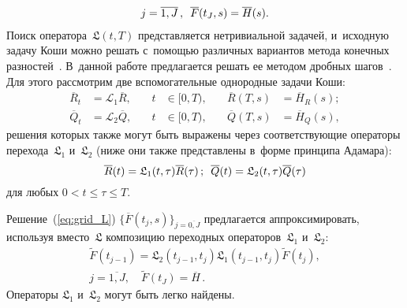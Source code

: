 \begin{multicols}{2}
\begin{multline}
 j=\overline{1,J}\,, \enskip \overline{F}(t_J,s) = \overline{H}(s).
\label{eq:grid_L}
\end{multline}
Поиск оператора~$\mathfrak{L}(t,T)$ пред\-став\-ля\-ет\-ся не\-три\-ви\-аль\-ной задачей, и~исход\-ную задачу Коши мож\-но решать 
с~по\-мощью различных вариантов метода конечных разностей~\cite{TS_04}. В~данной работе предлагается решать ее методом дроб\-ных шагов~\cite{Ya_67}. 
Для этого рас\-смот\-рим две вспомогательные од\-но\-род\-ные задачи \mbox{Коши}:
\begin{alignat}{3}
\overline{R}_t &= \mathcal{L}_1 \overline{R}, &\quad t &\in [0,T), &\quad
\overline{R}(T,s) &=\overline{H}_R(s);
\label{eq:Cauchy_1}
\\[2pt]
\overline{Q}_t &=  \mathcal{L}_2 \overline{Q}, &\quad
t &\in [0,T), &\quad
\overline{Q}(T,s) &=\overline{H}_Q(s),
\label{eq:Cauchy_2}
\end{alignat}
решения которых так\-же могут быть выражены через со\-от\-вет\-ст\-ву\-ющие операторы перехода~$\mathfrak{L}_1$ и~$\mathfrak{L}_2$ 
(ниже они также пред\-став\-ле\-ны в~форме принципа Ада\-мара):
\begin{equation*}
\overline{R}(t) =  \mathfrak{L}_1(t,\tau) \overline{R}(\tau)\,;\enskip
\overline{Q}(t) =  \mathfrak{L}_2(t,\tau) \overline{Q}(\tau)
\end{equation*}
для любых $0 < t \leqslant \tau \leqslant T$.

Решение~(\ref{eq:grid_L}) $\{\overline{F}(t_j,s)\}_{j=\overline{0,J}}$ предлагается ап\-прок\-си\-ми\-ро\-вать, используя вмес\-то~$\mathfrak{L}$ композицию 
переходных операторов~$\mathfrak{L}_1$ и~$\mathfrak{L}_2$:
\begin{multline}
\widetilde{F}(t_{j-1}) =  \mathfrak{L}_2(t_{j-1},t_j) \mathfrak{L}_1(t_{j-1},t_j)
\widetilde{F}(t_j), \\[2pt]
 j=\overline{1,J}, \quad \widetilde{F}(t_J) = \overline{H}\,.
\label{eq:grid_L_app}
\end{multline}
Операторы $\mathfrak{L}_1$ и~$\mathfrak{L}_2$ могут быть легко найдены.


\end{multicols}
